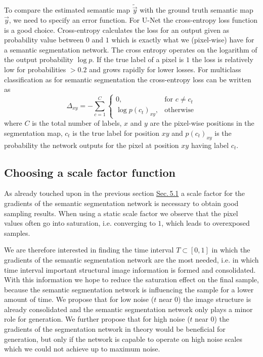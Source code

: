 To compare the estimated semantic map $\tilde{\vec{y}}$ with the ground truth semantic map $\vec{y}$, we need to specify an error function. For U-Net the cross-entropy loss function is a good choice. Cross-entropy calculates the loss for an output given as probability value between $0$ and $1$ which is exactly what we (pixel-wise) have for a semantic segmentation network. The cross entropy operates on the logarithm of the output probability $\log p$. If the true label of a pixel is $1$ the loss is relatively low for probabilities $>0.2$ and grows rapidly for lower losses. For multiclass classification as for semantic segmentation the cross-entropy loss can be written as
%
\begin{equation}
    \Delta_{xy}=-\sum_{c=1}^C 
    \begin{cases}
        0, &\text{for } c\neq c_t\\
        \log p(c_t)_{xy}, &\text{otherwise}
    \end{cases}
\end{equation}
%
where $C$ is the total number of labels, $x$ and $y$ are the pixel-wise positions in the segmentation map, $c_t$ is the true label for position $xy$ and $p(c_t)_{xy}$ is the probability the network outputs for the pixel at position $xy$ having label $c_t$.
%
\subsection{Choosing a scale factor function}
As already touched upon in the previous section \hyperref[sec:5.1]{Sec.\,5.1} a scale factor for the gradients of the semantic segmentation network is necessary to obtain good sampling results. When using a static scale factor we observe that the pixel values often go into saturation, i.e. converging to $1$, which leads to overexposed samples. 

We are therefore interested in finding the time interval $T\subset[0,1]$ in which the gradients of the semantic segmentation network are the most needed, i.e. in which time interval important structural image information is formed and consolidated. With this information we hope to reduce the saturation effect on the final sample, because the semantic segmentation network is influencing the sample for a lower amount of time. We propose that for low noise ($t$ near $0$) the image structure is already consolidated and the semantic segmentation network only plays a minor role for generation. We further propose that for high noise ($t$ near $0$) the gradients of the segmentation network in theory would be beneficial for generation, but only if the network is capable to operate on high noise scales which we could not achieve up to maximum noise.

